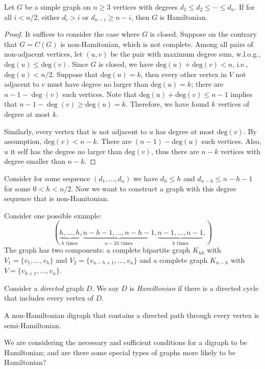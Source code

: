 \begin{theorem}[Chvatal]
Let $G$ be a simple graph on $n\ge3$ vertices with degrees $d_1\le d_2\le\cdots\le d_n$.
If for all $i<n/2$,
either $d_i>i$ or $d_{n-i}\ge n-i$, then $G$ is Hamiltonian.
\end{theorem}
\begin{proof}
It suffices to consider the case where $G$ is closed.
Suppose on the contrary that $G=C(G)$ is non-Hamitonian, which is not complete.
Among all pairs of non-adjacent vertices, let $(u,v)$ be the pair with maximum degree sum, w.l.o.g., $\text{deg}(u)\le\text{deg}(v)$.
Since $G$ is closed, we have $\text{deg}(u)+\text{deg}(v)<n$, i.e., $\text{deg}(u)<n/2$.
Suppose that $\text{deg}(u)=k$, then every other vertex in $V$ not adjacent to $v$ must have degree no larger than $\text{deg}(u)=k$; there are $n-1-\deg(v)$ such vertices.
Note that $\text{deg}(u)+\text{deg}(v)\le n-1$ implies that $n-1-\deg(v)\ge\text{deg}(u)=k$.
Therefore, we have found $k$ vertices of degree at most $k$.

Similarly, every vertex that is not adjacent to $u$ has degree at most $\text{deg}(v)$.
By assumption, $\text{deg}(v)<n-k$.
There are $(n-1)-\text{deg}(u)$ such vertices.
Also, $u$ it self has the degree no larger than $\text{deg}(v)$, thus there are $n-k$ vertices with degree smaller than $n-k$.
\end{proof}

Consider for some sequence $(d_1,\dots,d_n)$ we have $d_h\le h$ and $d_{n-h}\le n-h-1$ for some $0<h<n/2$. Now we want to construct a graph with this degree sequence that is non-Hamitonian.

Consider one possible example:
\[
(\underbrace{h,\dots,h}_{\text{$h$ times}},
\underbrace{n-h-1,\dots,n-h-1}_{\text{$n-2h$ times}},
\underbrace{n-1,\dots,n-1}_{\text{$h$ times}},
)
\]
The graph has two components: a complete bipartite graph $K_{hh}$ with $V_1=\{v_1,\dots,v_h\}$ and $V_2=\{v_{n-h+1},\dots,v_n\}$ and a complete graph $K_{n-h}$ with $V=\{v_{h+1},\dots,v_n\}$.

\begin{definition}
Consider a \emph{directed} graph $D$. We say $D$ is \emph{Hamiltonian} if there is a directed cycle that includes every vertex of $D$.

A non-Hamiltonian digraph that contains a directed path through every vertex is semi-Hamiltonian.
\end{definition}

We are considering the necessary and sufficient conditions for a digraph to be Hamiltonian; and are there some special types of graphs more likely to be Hamiltonian?

